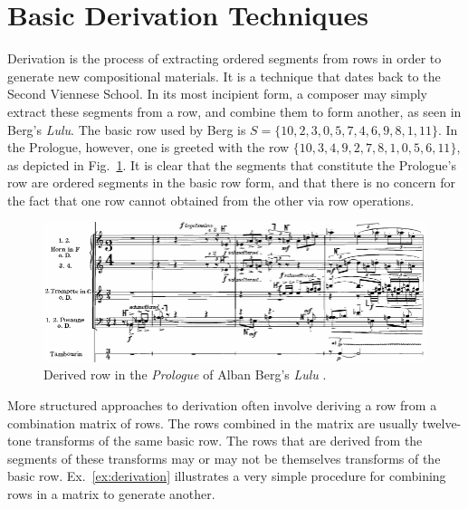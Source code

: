 \section{Basic Derivation Techniques}

Derivation is the process of extracting ordered segments from rows in order to generate new compositional materials. It is a technique that dates back to the Second Viennese School. In its most incipient form, a composer may simply extract these segments from a row, and combine them to form another, as seen in Berg's \emph{Lulu}. The basic row used by Berg is $S = \{ 10, 2, 3, 0, 5, 7, 4, 6, 9, 8, 1, 11 \}$. In the Prologue, however, one is greeted with the row $\{ 10, 3, 4, 9, 2, 7, 8, 1, 0, 5, 6, 11 \}$, as depicted in Fig.~\ref{fig:berg-prologue}. It is clear that the segments that constitute the Prologue's row are ordered segments in the basic row form, and that there is no concern for the fact that one row cannot obtained from the other via row operations.

\begin{figure}[htbp]
    \centering
	\includegraphics[width=6.5in]{figures/berg2.png}
	\caption[Derived Row in Berg's \emph{Lulu}]{Derived row in the \emph{Prologue} of Alban Berg's \emph{Lulu} \cite[182]{Starr1984}.}
	\label{fig:berg-prologue}
\end{figure}

More structured approaches to derivation often involve deriving a row from a combination matrix of rows. The rows combined in the matrix are usually twelve-tone transforms of the same basic row. The rows that are derived from the segments of these transforms may or may not be themselves transforms of the basic row. Ex.~\ref{ex:derivation} illustrates a very simple procedure for combining rows in a matrix to generate another.


